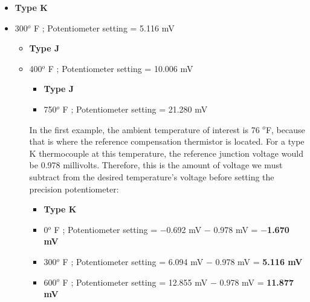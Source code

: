 \begin{itemize}
\item{} {\bf Type K}
\item{} 300$^{o}$ F ; Potentiometer setting = 5.116 mV 
\medskip

\vskip 10pt

\begin{itemize}
\item{} {\bf Type J}
\item{} 400$^{o}$ F ; Potentiometer setting = 10.006 mV 
\medskip

\vskip 10pt

\begin{itemize}
\item{} {\bf Type J}
\item{} 750$^{o}$ F ; Potentiometer setting = 21.280 mV
\end{itemize}







In the first example, the ambient temperature of interest is 76 $^{o}$F, because that is where the reference compensation thermistor is located.  For a type K thermocouple at this temperature, the reference junction voltage would be 0.978 millivolts.  Therefore, this is the amount of voltage we must subtract from the desired temperature's voltage before setting the precision potentiometer:

\begin{itemize}
\item{} {\bf Type K}
\item{} 0$^{o}$ F ; Potentiometer setting = $-$0.692 mV $-$ 0.978 mV = {\bf $-$1.670 mV}
\item{} 300$^{o}$ F ; Potentiometer setting = 6.094 mV $-$ 0.978 mV = {\bf 5.116 mV} 
\item{} 600$^{o}$ F ; Potentiometer setting = 12.855 mV $-$ 0.978 mV = {\bf 11.877 mV}
\end{itemize}


\end{itemize}
\end{itemize}
